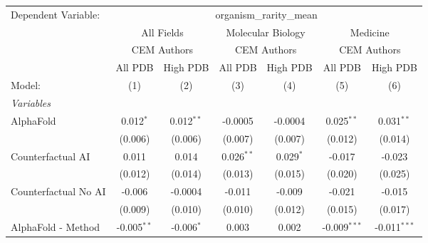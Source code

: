 \begingroup
\centering
\begin{tabular}{lcccccc}
   \tabularnewline \midrule \midrule
   Dependent Variable: & \multicolumn{6}{c}{organism\_rarity\_mean}\\
 & \multicolumn{2}{c}{All Fields} & \multicolumn{2}{c}{Molecular Biology} & \multicolumn{2}{c}{Medicine} \\
\cmidrule(lr){2-3} \cmidrule(lr){4-5} \cmidrule(lr){6-7}
 & \multicolumn{2}{c}{CEM Authors} & \multicolumn{2}{c}{CEM Authors} & \multicolumn{2}{c}{CEM Authors} \\
\cmidrule(lr){2-3} \cmidrule(lr){4-5} \cmidrule(lr){6-7}
 & \multicolumn{1}{c}{All PDB} & \multicolumn{1}{c}{High PDB} & \multicolumn{1}{c}{All PDB} & \multicolumn{1}{c}{High PDB} & \multicolumn{1}{c}{All PDB} & \multicolumn{1}{c}{High PDB} \\
\cmidrule(lr){2-2} \cmidrule(lr){3-3} \cmidrule(lr){4-4} \cmidrule(lr){5-5} \cmidrule(lr){6-6} \cmidrule(lr){7-7}
   Model:                                                     & (1)           & (2)           & (3)          & (4)            & (5)            & (6)\\  
   \midrule
   \emph{Variables}\\
   AlphaFold                                                  & 0.012$^{*}$   & 0.012$^{**}$  & -0.0005      & -0.0004        & 0.025$^{**}$   & 0.031$^{**}$\\   
                                                              & (0.006)       & (0.006)       & (0.007)      & (0.007)        & (0.012)        & (0.014)\\   
   Counterfactual AI                                          & 0.011         & 0.014         & 0.026$^{**}$ & 0.029$^{*}$    & -0.017         & -0.023\\   
                                                              & (0.012)       & (0.014)       & (0.013)      & (0.015)        & (0.020)        & (0.025)\\   
   Counterfactual No AI                                       & -0.006        & -0.0004       & -0.011       & -0.009         & -0.021         & -0.015\\   
                                                              & (0.009)       & (0.010)       & (0.010)      & (0.012)        & (0.015)        & (0.017)\\   
   AlphaFold - Method                                         & -0.005$^{**}$ & -0.006$^{*}$  & 0.003        & 0.002          & -0.009$^{***}$ & -0.011$^{***}$\\   

\end{tabular}
